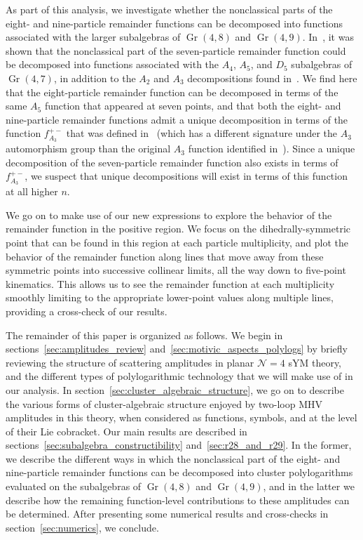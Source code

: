 \documentclass[11pt]{article}
\DeclareMathOperator{\Gr}{Gr}
\begin{document}
As part of this analysis, we investigate whether the nonclassical parts of the eight- and nine-particle remainder functions can be decomposed into functions associated with the larger subalgebras of $\Gr(4,8)$ and $\Gr(4,9)$. In~\cite{Golden:2018gtk}, it was shown that the nonclassical part of the seven-particle remainder function could be decomposed into functions associated with the $A_4$, $A_5$, and $D_5$ subalgebras of $\Gr(4,7)$, in addition to the $A_2$ and $A_3$ decompositions found in~\cite{Golden:2014xqa}. We find here that the eight-particle remainder function can be decomposed in terms of the same $A_5$ function that appeared at seven points, and that both the eight- and nine-particle remainder functions admit a unique decomposition in terms of the function $f_{A_3}^{+-}$ that was defined in~\cite{Golden:2014xqa} (which has a different signature under the $A_3$ automorphism group than the original $A_3$ function identified in~\cite{Golden:2014xqa}). Since a unique decomposition of the seven-particle remainder function also exists in terms of $f_{A_3}^{+-}$, we suspect that unique decompositions will exist in terms of this function at all higher $n$.

We go on to make use of our new expressions to explore the behavior of the remainder function in the positive region. We focus on the dihedrally-symmetric point that can be found in this region at each particle multiplicity, and plot the behavior of the remainder function along lines that move away from these symmetric points into successive collinear limits, all the way down to five-point kinematics. This allows us to see the remainder function at each multiplicity smoothly limiting to the appropriate lower-point values along multiple lines, providing a cross-check of our results.
 
The remainder of this paper is organized as follows. We begin in sections~\ref{sec:amplitudes_review} and~\ref{sec:motivic_aspects_polylogs} by briefly reviewing the structure of scattering amplitudes in planar $\mathcal{N}=4$ sYM theory, and the different types of polylogarithmic technology that we will make use of in our analysis. In section~\ref{sec:cluster_algebraic_structure}, we go on to describe the various forms of cluster-algebraic structure enjoyed by two-loop MHV amplitudes in this theory, when considered as functions, symbols, and at the level of their Lie cobracket. Our main results are described in sections~\ref{sec:subalgebra_constructibility} and~\ref{sec:r28_and_r29}. In the former, we describe the different ways in which the nonclassical part of the eight- and nine-particle remainder functions can be decomposed into cluster polylogarithms evaluated on the subalgebras of $\Gr(4,8)$ and $\Gr(4,9)$, and in the latter we describe how the remaining function-level contributions to these amplitudes can be determined. After presenting some numerical results and cross-checks in section~\ref{sec:numerics}, we conclude.
\end{document}
